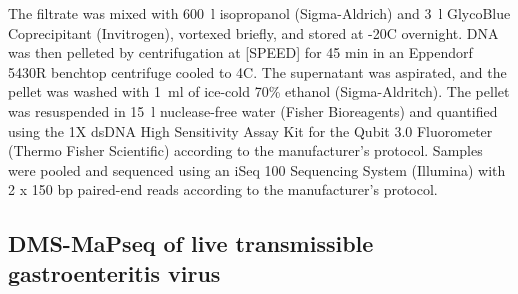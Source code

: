\documentclass[main.tex]{subfiles}
\begin{document}
The filtrate was mixed with 600~\textmu l isopropanol (Sigma-Aldrich) and 3~\textmu l GlycoBlue Coprecipitant (Invitrogen), vortexed briefly, and stored at -20\textdegree C overnight.
DNA was then pelleted by centrifugation at [SPEED] for 45 min in an Eppendorf 5430R benchtop centrifuge cooled to 4\textdegree C.
The supernatant was aspirated, and the pellet was washed with 1~ml of ice-cold 70\% ethanol (Sigma-Aldritch).
The pellet was resuspended in 15~\textmu l nuclease-free water (Fisher Bioreagents) and quantified using the 1X dsDNA High Sensitivity Assay Kit for the Qubit 3.0 Fluorometer (Thermo Fisher Scientific) according to the manufacturer's protocol.
Samples were pooled and sequenced using an iSeq 100 Sequencing System (Illumina) with 2 x 150 bp paired-end reads according to the manufacturer's protocol.

\subsection{DMS-MaPseq of live transmissible gastroenteritis virus}
\end{document}
